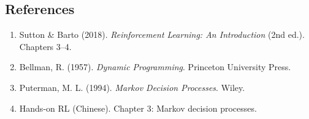 \documentclass{article}
\begin{document}
\subsection*{References}

\begin{enumerate}
  \item Sutton \& Barto (2018). \textit{Reinforcement Learning: An Introduction} (2nd ed.). Chapters 3--4.
  \item Bellman, R. (1957). \textit{Dynamic Programming}. Princeton University Press.
  \item Puterman, M. L. (1994). \textit{Markov Decision Processes}. Wiley.
  \item Hands-on RL (Chinese). Chapter 3: Markov decision processes.
\end{enumerate}
\end{document}
